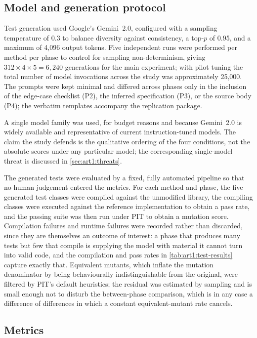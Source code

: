\subsection{Model and generation protocol}
\label{sec:art1:protocol}

Test generation used Google's Gemini~2.0, configured with a sampling temperature
of 0.3 to balance diversity against consistency, a top-$p$ of 0.95, and a
maximum of 4{,}096 output tokens. Five independent runs were performed per method
per phase to control for sampling non-determinism, giving $312 \times 4 \times 5 =
6{,}240$ generations for the main experiment; with pilot tuning the total number
of model invocations across the study was approximately 25{,}000. The prompts were
kept minimal and differed across phases only in the inclusion of the edge-case
checklist (P2), the inferred specification (P3), or the source body (P4); the
verbatim templates accompany the replication package.

A single model family was used, for budget reasons and because Gemini~2.0 is
widely available and representative of current instruction-tuned models. The claim
the study defends is the qualitative ordering of the four conditions, not the
absolute scores under any particular model; the corresponding single-model threat
is discussed in \cref{sec:art1:threats}.

The generated tests were evaluated by a fixed, fully automated pipeline so that no
human judgement entered the metrics. For each method and phase, the five generated
test classes were compiled against the unmodified library, the compiling classes
were executed against the reference implementation to obtain a pass rate, and the
passing suite was then run under PIT to obtain a mutation score. Compilation
failures and runtime failures were recorded rather than discarded, since they are
themselves an outcome of interest: a phase that produces many tests but few that
compile is supplying the model with material it cannot turn into valid code, and
the compilation and pass rates in \cref{tab:art1:test-results} capture exactly
that. Equivalent mutants, which inflate the mutation denominator by being
behaviourally indistinguishable from the original, were filtered by PIT's default
heuristics; the residual was estimated by sampling and is small enough not to
disturb the between-phase comparison, which is in any case a difference of
differences in which a constant equivalent-mutant rate cancels.

\subsection{Metrics}
\label{sec:art1:metrics}

